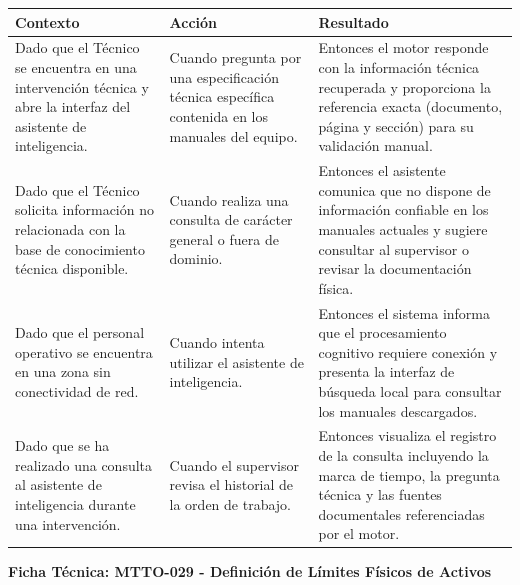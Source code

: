\footnotesize\begin{longtable}{|p{0.28\textwidth}|p{0.32\textwidth}|p{0.34\textwidth}|}\hline
\textbf{Contexto} & \textbf{Acción} & \textbf{Resultado} \\ \hline
\parbox[t]{\linewidth}{Dado que el Técnico se encuentra en una intervención técnica y abre la interfaz del asistente de inteligencia.} & \parbox[t]{\linewidth}{Cuando pregunta por una especificación técnica específica contenida en los manuales del equipo.} & \parbox[t]{\linewidth}{Entonces el motor responde con la información técnica recuperada y proporciona la referencia exacta (documento, página y sección) para su validación manual.} \\ \hline
\parbox[t]{\linewidth}{Dado que el Técnico solicita información no relacionada con la base de conocimiento técnica disponible.} & \parbox[t]{\linewidth}{Cuando realiza una consulta de carácter general o fuera de dominio.} & \parbox[t]{\linewidth}{Entonces el asistente comunica que no dispone de información confiable en los manuales actuales y sugiere consultar al supervisor o revisar la documentación física.} \\ \hline
\parbox[t]{\linewidth}{Dado que el personal operativo se encuentra en una zona sin conectividad de red.} & \parbox[t]{\linewidth}{Cuando intenta utilizar el asistente de inteligencia.} & \parbox[t]{\linewidth}{Entonces el sistema informa que el procesamiento cognitivo requiere conexión y presenta la interfaz de búsqueda local para consultar los manuales descargados.} \\ \hline
\parbox[t]{\linewidth}{Dado que se ha realizado una consulta al asistente de inteligencia durante una intervención.} & \parbox[t]{\linewidth}{Cuando el supervisor revisa el historial de la orden de trabajo.} & \parbox[t]{\linewidth}{Entonces visualiza el registro de la consulta incluyendo la marca de tiempo, la pregunta técnica y las fuentes documentales referenciadas por el motor.} \\ \hline
\end{longtable}\normalsize
\vspace{1em}
\noindent\textbf{Ficha Técnica: MTTO-029 - Definición de Límites Físicos de Activos}
\footnotesize\setlength{\tabcolsep}{4pt}\renewcommand{\arraystretch}{1.2}
